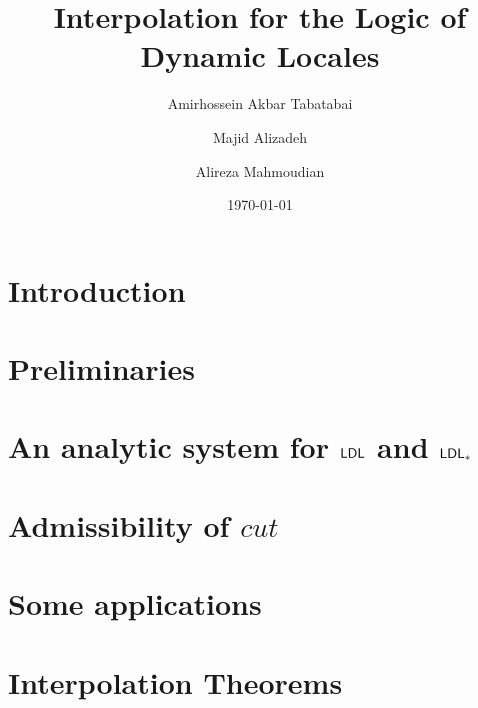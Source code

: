 \documentclass[10pt,a4paper]{amsart}
\begin{document}
\title{Interpolation for the Logic of Dynamic Locales}
\author{Amirhossein Akbar Tabatabai}


\author{Majid Alizadeh}

\author{Alireza Mahmoudian}

\date{\today}
 
\begin{abstract}
	
\end{abstract}

\maketitle



\section{Introduction}


\section{Preliminaries}


\section{An analytic system for $\mathsf{LDL}$ and $\mathsf{LDL}_*$}


\section{Admissibility of $cut$}


\section{Some applications}


\section{Interpolation Theorems}




\end{document}
